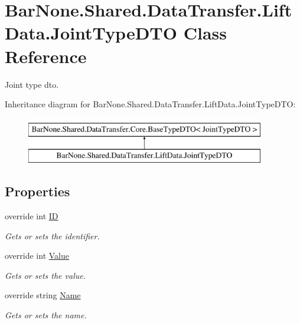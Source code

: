 \hypertarget{class_bar_none_1_1_shared_1_1_data_transfer_1_1_lift_data_1_1_joint_type_d_t_o}{}\section{Bar\+None.\+Shared.\+Data\+Transfer.\+Lift\+Data.\+Joint\+Type\+D\+TO Class Reference}
\label{class_bar_none_1_1_shared_1_1_data_transfer_1_1_lift_data_1_1_joint_type_d_t_o}


Joint type dto.  


Inheritance diagram for Bar\+None.\+Shared.\+Data\+Transfer.\+Lift\+Data.\+Joint\+Type\+D\+TO\+:\begin{figure}[H]
\begin{center}
\leavevmode
\includegraphics[height=2.000000cm]{class_bar_none_1_1_shared_1_1_data_transfer_1_1_lift_data_1_1_joint_type_d_t_o}
\end{center}
\end{figure}
\subsection*{Properties}
\begin{DoxyCompactItemize}
\item 
override int \mbox{\hyperlink{class_bar_none_1_1_shared_1_1_data_transfer_1_1_lift_data_1_1_joint_type_d_t_o_a2bec010e585d6b504d3a6903af1f2daa}{ID}}
\begin{DoxyCompactList}\small\item\em Gets or sets the identifier. \end{DoxyCompactList}\item 
override int \mbox{\hyperlink{class_bar_none_1_1_shared_1_1_data_transfer_1_1_lift_data_1_1_joint_type_d_t_o_af186a6f652e713d026cdb9e061274844}{Value}}
\begin{DoxyCompactList}\small\item\em Gets or sets the value. \end{DoxyCompactList}\item 
override string \mbox{\hyperlink{class_bar_none_1_1_shared_1_1_data_transfer_1_1_lift_data_1_1_joint_type_d_t_o_a39ad5e0a691f9674c310f7d9219e4556}{Name}}
\begin{DoxyCompactList}\small\item\em Gets or sets the name. \end{DoxyCompactList}\end{DoxyCompactItemize}


